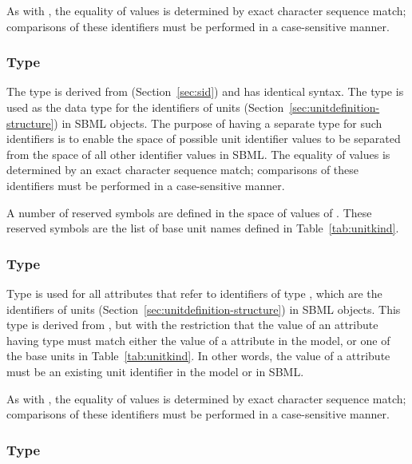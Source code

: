 As with , the equality of  values
is determined by exact character sequence match; \ie comparisons
of these identifiers must be performed in a case-sensitive manner.


\subsubsection{Type }
\label{sec:unitsid}

The type  is derived from 
(Section~\ref{sec:sid}) and has identical syntax.  The
 type is used as the data type for the
identifiers of units (Section~\ref{sec:unitdefinition-structure})
in SBML objects.  The purpose of having a separate type for such
identifiers is to enable the space of possible unit identifier
values to be separated from the space of all other identifier
values in SBML.  The equality of  values is
determined by an exact character sequence match; \ie comparisons
of these identifiers must be performed in a case-sensitive manner.

A number of reserved symbols are defined in the space of values of
.  These reserved symbols are the list of base
unit names defined in Table~\vref{tab:unitkind}.


\subsubsection{Type }
\label{sec:unitsidref}

Type  is used for all attributes that refer
to identifiers of type , which are the
identifiers of units (Section~\ref{sec:unitdefinition-structure})
in SBML objects.  This type is derived from ,
but with the restriction that the value of an attribute having
type  must match either the value of a
 attribute in the model, or one of the
base units in Table~\ref{tab:unitkind}.  In other words,
the value of a  attribute must be an existing
unit identifier in the model or in SBML.

As with , the equality of 
values is determined by exact character sequence match; \ie
comparisons of these identifiers must be performed in a
case-sensitive manner.


\subsubsection{Type }
\label{sec:sboterm-type}

